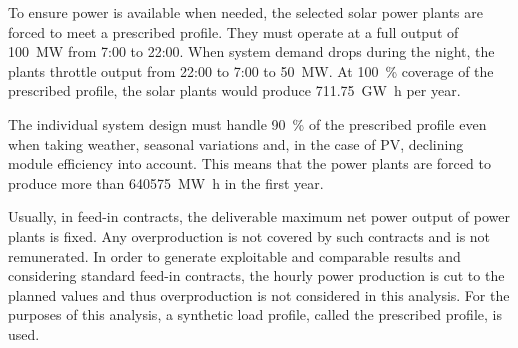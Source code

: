 To ensure power is available when needed, the selected solar power plants are forced to meet a prescribed profile. They must operate at a full output of \SI{100}{\mega\watt} from 7:00 to 22:00. When system demand drops during the night, the plants throttle output from 22:00 to 7:00 to \SI{50}{\mega\watt}. At \SI{100}{\percent} coverage of the prescribed profile, the solar plants would produce \SI{711.75}{\giga\watt\hour} per year.


The individual system design must handle \SI{90}{\percent} of the prescribed profile even when taking weather, seasonal variations and, in the case of PV, declining module efficiency into account. This means that the power plants are forced to produce more than \SI{640575}{\mega\watt\hour} in the first year.

Usually, in feed-in contracts, the deliverable maximum net power output of power plants is fixed. Any overproduction is not covered by such contracts and is not remunerated. In order to generate exploitable and comparable results and considering standard feed-in contracts, the hourly power production is cut to the planned values and thus overproduction is not considered in this analysis. For the purposes of this analysis, a synthetic load profile, called the prescribed profile, is used.



